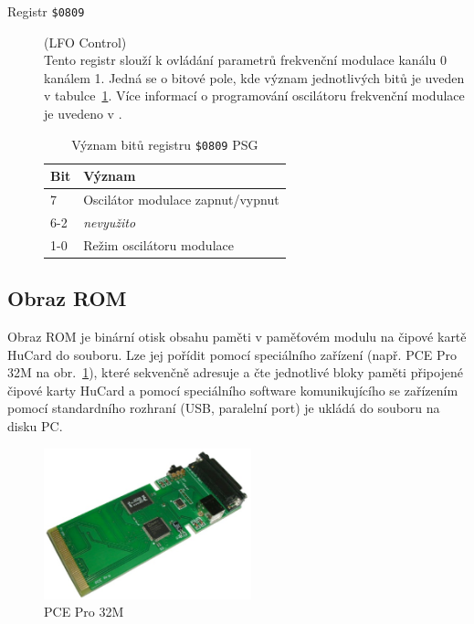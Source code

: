 \begin{description}
\item [Registr {\tt \$0809}] (LFO Control) \\
	Tento registr slouží k ovládání parametrů frekvenční modulace kanálu 0
	kanálem 1. Jedná se o bitové pole, kde význam jednotlivých bitů je uveden v
	tabulce~\ref{tab:psg_lfo}. Více informací o programování oscilátoru
	frekvenční modulace je uvedeno v \cite{Clifford}.

	\begin{table}[ht]
	\begin{center}
	\begin{tabular}{|l|l|}
	\hline
	\textbf{Bit} & \textbf{Význam} \\
	\hline
		7 & Oscilátor modulace zapnut/vypnut \\
		6-2 & {\em nevyužito} \\
		1-0 & Režim oscilátoru modulace \\
	\hline
	\end{tabular}
	\end{center}
		\caption{Význam bitů registru {\tt \$0809} PSG\label{tab:psg_lfo}}
	\end{table}

\end{description}

%
%

\subsection{Obraz ROM}\label{chap:spec_hw_rom}

Obraz ROM je binární otisk obsahu paměti v paměťovém modulu na čipové kartě
HuCard do souboru. Lze jej pořídit pomocí speciálního zařízení (např. PCE Pro
32M na obr.~\ref{fig:pce_pcepro32}), které sekvenčně adresuje a čte jednotlivé
bloky paměti připojené čipové karty HuCard a pomocí speciálního software
komunikujícího se zařízením pomocí standardního rozhraní (USB, paralelní port)
je ukládá do souboru na disku PC.

\begin{figure}[ht]
\begin{center}
\includegraphics[width=6cm]{fig/pce_pcepro32}
\caption{PCE Pro 32M\label{fig:pce_pcepro32}}
\end{center}
\end{figure}

